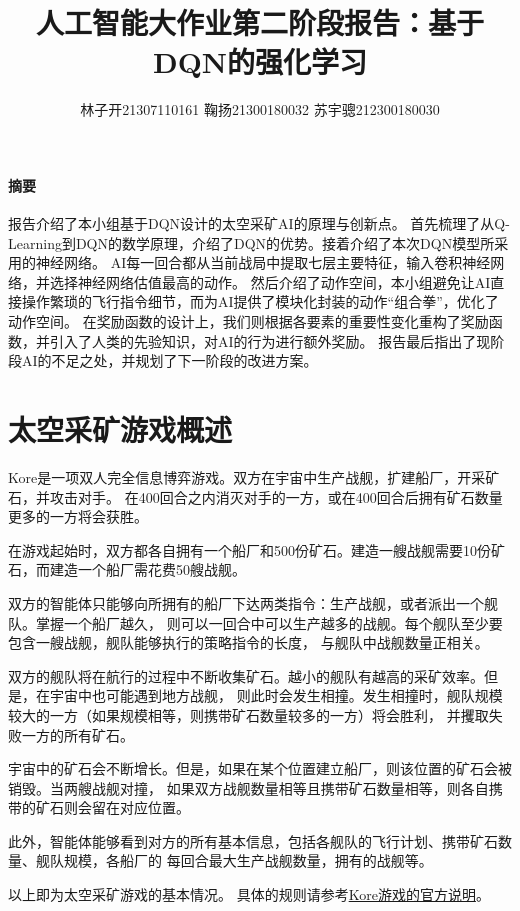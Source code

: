 \documentclass[10pt]{article}
\title{人工智能大作业第二阶段报告：基于DQN的强化学习}
\author{林子开21307110161 鞠扬21300180032 苏宇骢212300180030}
\begin{document}
	\maketitle

\paragraph*{摘要} 报告介绍了本小组基于DQN设计的太空采矿AI的原理与创新点。
首先梳理了从Q-Learning到DQN的数学原理，介绍了DQN的优势。接着介绍了本次DQN模型所采用的神经网络。
AI每一回合都从当前战局中提取七层主要特征，输入卷积神经网络，并选择神经网络估值最高的动作。
然后介绍了动作空间，本小组避免让AI直接操作繁琐的飞行指令细节，而为AI提供了模块化封装的动作“组合拳”，优化了动作空间。
在奖励函数的设计上，我们则根据各要素的重要性变化重构了奖励函数，并引入了人类的先验知识，对AI的行为进行额外奖励。
报告最后指出了现阶段AI的不足之处，并规划了下一阶段的改进方案。


\section{太空采矿游戏概述}
Kore是一项双人完全信息博弈游戏。双方在宇宙中生产战舰，扩建船厂，开采矿石，并攻击对手。
在400回合之内消灭对手的一方，或在400回合后拥有矿石数量更多的一方将会获胜。

在游戏起始时，双方都各自拥有一个船厂和500份矿石。建造一艘战舰需要10份矿石，而建造一个船厂需花费50艘战舰。

双方的智能体只能够向所拥有的船厂下达两类指令：生产战舰，或者派出一个舰队。掌握一个船厂越久，
则可以一回合中可以生产越多的战舰。每个舰队至少要包含一艘战舰，舰队能够执行的策略指令的长度，
与舰队中战舰数量正相关。

双方的舰队将在航行的过程中不断收集矿石。越小的舰队有越高的采矿效率。但是，在宇宙中也可能遇到地方战舰，
则此时会发生相撞。发生相撞时，舰队规模较大的一方（如果规模相等，则携带矿石数量较多的一方）将会胜利，
并攫取失败一方的所有矿石。

宇宙中的矿石会不断增长。但是，如果在某个位置建立船厂，则该位置的矿石会被销毁。当两艘战舰对撞，
如果双方战舰数量相等且携带矿石数量相等，则各自携带的矿石则会留在对应位置。

此外，智能体能够看到对方的所有基本信息，包括各舰队的飞行计划、携带矿石数量、舰队规模，各船厂的
每回合最大生产战舰数量，拥有的战舰等。

以上即为太空采矿游戏的基本情况。
具体的规则请参考\href{https://www.kaggle.com/competitions/sds-ai-kore/overview}{Kore游戏的官方说明}。
\end{document}
